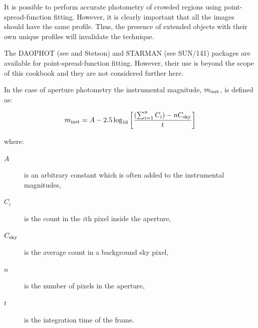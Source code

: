 \documentclass[twoside,11pt,nolof]{starlink}
\begin{document}
\begin{description}
   It is possible to perform accurate photometry of crowded regions
   using point-spread-function fitting.  However, it is clearly
   important that all the images should have the same profile.  Thus,
   the presence of extended objects with their own unique profiles
   will invalidate the technique.

   The DAOPHOT (see \cite{SUN42} and
   Stetson\cite{STETSON87}) and STARMAN (see SUN/141\cite{SUN141})
   packages are available for
   point-spread-function fitting.  However, their use is beyond the scope
   of this cookbook and they are not considered further here.

\end{description}

In the case of aperture photometry the instrumental magnitude,
$m_{\rm inst}$, is defined as:

\begin{equation}
m_{\rm inst} = A - 2.5 \log_{10} \left[
       \frac{( \sum_{i=1}^{n} C_{i} )  - n C_{\rm sky} }{t}
       \right]  \label{INSTREQN}
\end{equation}

where:

\begin{description}

  \item[$A$] is an arbitrary constant which is often added to the
   instrumental magnitudes,

  \item[$C_{i}$] is the count in the $i$th pixel inside the aperture,

  \item[$C_{\rm sky}$] is the average count in a background sky pixel,

  \item[$n$] is the number of pixels in the aperture,

  \item[$t$] is the integration time of the frame.

\end{description}
\end{document}
